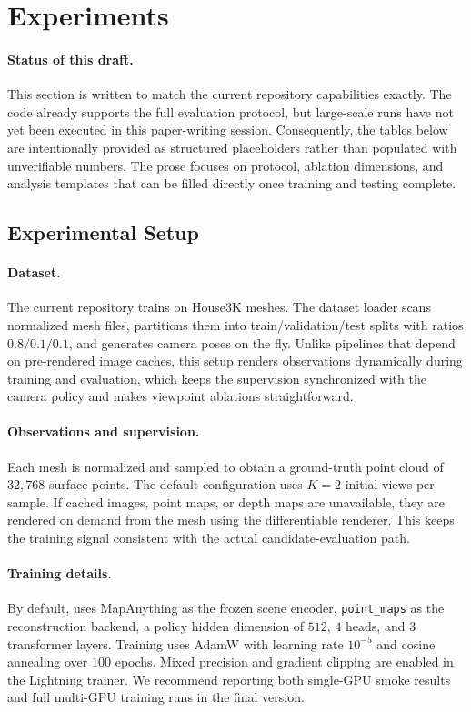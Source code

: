 \section{Experiments}
\label{sec:experiments}

\paragraph{Status of this draft.}
This section is written to match the current repository capabilities exactly. The code already supports the full evaluation protocol, but large-scale runs have not yet been executed in this paper-writing session. Consequently, the tables below are intentionally provided as structured placeholders rather than populated with unverifiable numbers. The prose focuses on protocol, ablation dimensions, and analysis templates that can be filled directly once training and testing complete.

\subsection{Experimental Setup}
\label{sec:setup}

\paragraph{Dataset.}
The current repository trains on House3K meshes. The dataset loader scans normalized mesh files, partitions them into train/validation/test splits with ratios $0.8/0.1/0.1$, and generates camera poses on the fly. Unlike pipelines that depend on pre-rendered image caches, this setup renders observations dynamically during training and evaluation, which keeps the supervision synchronized with the camera policy and makes viewpoint ablations straightforward.

\paragraph{Observations and supervision.}
Each mesh is normalized and sampled to obtain a ground-truth point cloud of $32{,}768$ surface points. The default configuration uses $K=2$ initial views per sample. If cached images, point maps, or depth maps are unavailable, they are rendered on demand from the mesh using the differentiable renderer. This keeps the training signal consistent with the actual candidate-evaluation path.

\paragraph{Training details.}
By default, \method uses MapAnything as the frozen scene encoder, \texttt{point\_maps} as the reconstruction backend, a policy hidden dimension of $512$, $4$ heads, and $3$ transformer layers. Training uses AdamW with learning rate $10^{-5}$ and cosine annealing over $100$ epochs. Mixed precision and gradient clipping are enabled in the Lightning trainer. We recommend reporting both single-GPU smoke results and full multi-GPU training runs in the final version.

